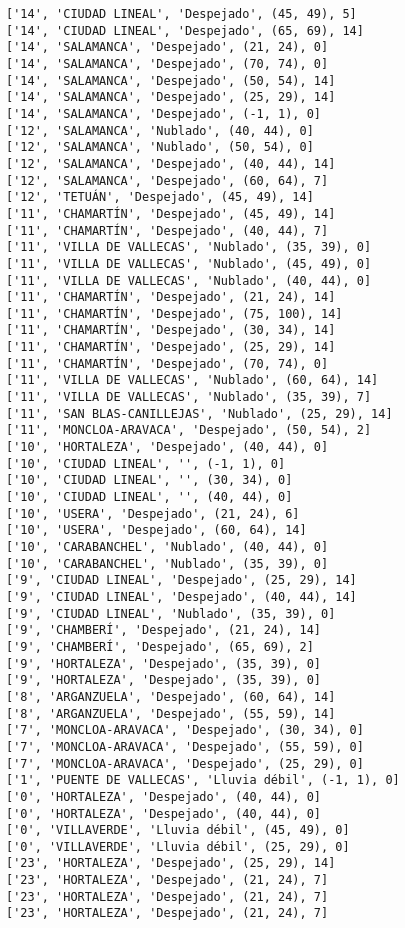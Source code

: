 \documentclass[11pt]{article}
\begin{document}
\begin{Verbatim}[commandchars=\\\{\}]
['14', 'CIUDAD LINEAL', 'Despejado', (45, 49), 5]
['14', 'CIUDAD LINEAL', 'Despejado', (65, 69), 14]
['14', 'SALAMANCA', 'Despejado', (21, 24), 0]
['14', 'SALAMANCA', 'Despejado', (70, 74), 0]
['14', 'SALAMANCA', 'Despejado', (50, 54), 14]
['14', 'SALAMANCA', 'Despejado', (25, 29), 14]
['14', 'SALAMANCA', 'Despejado', (-1, 1), 0]
['12', 'SALAMANCA', 'Nublado', (40, 44), 0]
['12', 'SALAMANCA', 'Nublado', (50, 54), 0]
['12', 'SALAMANCA', 'Despejado', (40, 44), 14]
['12', 'SALAMANCA', 'Despejado', (60, 64), 7]
['12', 'TETUÁN', 'Despejado', (45, 49), 14]
['11', 'CHAMARTÍN', 'Despejado', (45, 49), 14]
['11', 'CHAMARTÍN', 'Despejado', (40, 44), 7]
['11', 'VILLA DE VALLECAS', 'Nublado', (35, 39), 0]
['11', 'VILLA DE VALLECAS', 'Nublado', (45, 49), 0]
['11', 'VILLA DE VALLECAS', 'Nublado', (40, 44), 0]
['11', 'CHAMARTÍN', 'Despejado', (21, 24), 14]
['11', 'CHAMARTÍN', 'Despejado', (75, 100), 14]
['11', 'CHAMARTÍN', 'Despejado', (30, 34), 14]
['11', 'CHAMARTÍN', 'Despejado', (25, 29), 14]
['11', 'CHAMARTÍN', 'Despejado', (70, 74), 0]
['11', 'VILLA DE VALLECAS', 'Nublado', (60, 64), 14]
['11', 'VILLA DE VALLECAS', 'Nublado', (35, 39), 7]
['11', 'SAN BLAS-CANILLEJAS', 'Nublado', (25, 29), 14]
['11', 'MONCLOA-ARAVACA', 'Despejado', (50, 54), 2]
['10', 'HORTALEZA', 'Despejado', (40, 44), 0]
['10', 'CIUDAD LINEAL', '', (-1, 1), 0]
['10', 'CIUDAD LINEAL', '', (30, 34), 0]
['10', 'CIUDAD LINEAL', '', (40, 44), 0]
['10', 'USERA', 'Despejado', (21, 24), 6]
['10', 'USERA', 'Despejado', (60, 64), 14]
['10', 'CARABANCHEL', 'Nublado', (40, 44), 0]
['10', 'CARABANCHEL', 'Nublado', (35, 39), 0]
['9', 'CIUDAD LINEAL', 'Despejado', (25, 29), 14]
['9', 'CIUDAD LINEAL', 'Despejado', (40, 44), 14]
['9', 'CIUDAD LINEAL', 'Nublado', (35, 39), 0]
['9', 'CHAMBERÍ', 'Despejado', (21, 24), 14]
['9', 'CHAMBERÍ', 'Despejado', (65, 69), 2]
['9', 'HORTALEZA', 'Despejado', (35, 39), 0]
['9', 'HORTALEZA', 'Despejado', (35, 39), 0]
['8', 'ARGANZUELA', 'Despejado', (60, 64), 14]
['8', 'ARGANZUELA', 'Despejado', (55, 59), 14]
['7', 'MONCLOA-ARAVACA', 'Despejado', (30, 34), 0]
['7', 'MONCLOA-ARAVACA', 'Despejado', (55, 59), 0]
['7', 'MONCLOA-ARAVACA', 'Despejado', (25, 29), 0]
['1', 'PUENTE DE VALLECAS', 'Lluvia débil', (-1, 1), 0]
['0', 'HORTALEZA', 'Despejado', (40, 44), 0]
['0', 'HORTALEZA', 'Despejado', (40, 44), 0]
['0', 'VILLAVERDE', 'Lluvia débil', (45, 49), 0]
['0', 'VILLAVERDE', 'Lluvia débil', (25, 29), 0]
['23', 'HORTALEZA', 'Despejado', (25, 29), 14]
['23', 'HORTALEZA', 'Despejado', (21, 24), 7]
['23', 'HORTALEZA', 'Despejado', (21, 24), 7]
['23', 'HORTALEZA', 'Despejado', (21, 24), 7]

\end{Verbatim}
\end{document}
